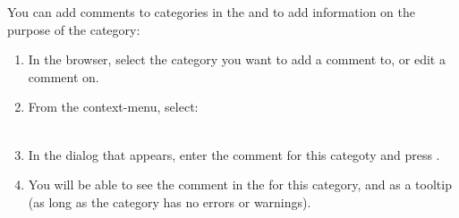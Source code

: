 
You can add comments to categories in the \gdtestsuitebrowser{} and \gdtestcasebrowser{} to add information on the purpose of the category:
\begin{enumerate}
\item In the browser, select the category you want to add a comment to, or edit a comment on.
\item From the context-menu, select:\\
\\
\item In the dialog that appears, enter the comment for this categoty and press .
\item You will be able to see the comment in the \gdpropview{} for this category, and as a tooltip (as long as the category has no errors or warnings).
\end{enumerate}
